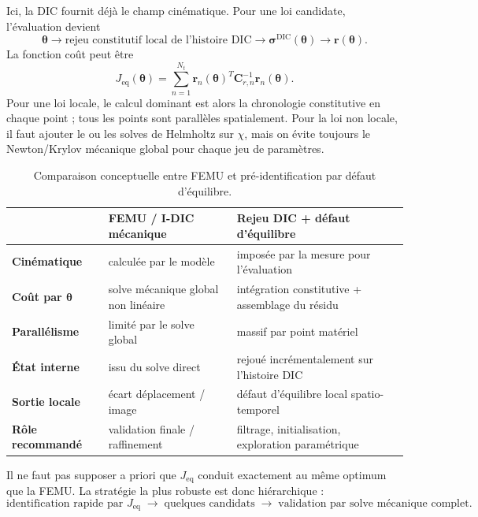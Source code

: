 \documentclass[11pt,a4paper]{article}
\newcommand{\Req}{\bm{r}}
\begin{document}
Ici, la DIC fournit déjà le champ cinématique. Pour une loi candidate, l'évaluation devient
\begin{equation}
 \bm{\theta}
 \longrightarrow
 \text{rejeu constitutif local de l'histoire DIC}
 \longrightarrow
 \bm{\sigma}^{\mathrm{DIC}}(\bm{\theta})
 \longrightarrow
 \Req(\bm{\theta}).
\end{equation}
La fonction coût peut être
\begin{equation}
  J_{\mathrm{eq}}(\bm{\theta})
  = \sum_{n=1}^{N_t}
  \Req_n(\bm{\theta})^T
  \bm{C}_{r,n}^{-1}
  \Req_n(\bm{\theta}).
  \label{eq:objective}
\end{equation}
Pour une loi locale, le calcul dominant est alors la chronologie constitutive en chaque point ; tous
les points sont parallèles spatialement. Pour la loi non locale, il faut ajouter le ou les solves de
Helmholtz sur $\chi$, mais on évite toujours le Newton/Krylov mécanique global pour chaque jeu de
paramètres.

\begin{table}[htbp]
\centering
\caption{Comparaison conceptuelle entre FEMU et pré-identification par défaut d'équilibre.}
\begin{tabularx}{\textwidth}{@{}>{\bfseries}p{3.2cm}XX@{}}
\toprule
 & FEMU / I-DIC mécanique & Rejeu DIC + défaut d'équilibre \\
\midrule
Cinématique & calculée par le modèle & imposée par la mesure pour l'évaluation \\
Coût par $\bm{\theta}$ & solve mécanique global non linéaire & intégration constitutive + assemblage du résidu \\
Parallélisme & limité par le solve global & massif par point matériel \\
État interne & issu du solve direct & rejoué incrémentalement sur l'histoire DIC \\
Sortie locale & écart déplacement / image & défaut d'équilibre local spatio-temporel \\
Rôle recommandé & validation finale / raffinement & filtrage, initialisation, exploration paramétrique \\
\bottomrule
\end{tabularx}
\end{table}

Il ne faut pas supposer a priori que $J_{\mathrm{eq}}$ conduit exactement au même optimum que la
FEMU. La stratégie la plus robuste est donc hiérarchique :
\begin{equation}
  \boxed{
  \text{identification rapide par }J_{\mathrm{eq}}
  \;\longrightarrow\;
  \text{quelques candidats}
  \;\longrightarrow\;
  \text{validation par solve mécanique complet.}
  }
\end{equation}
\end{document}
